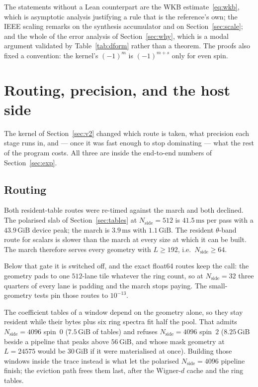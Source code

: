 \documentclass[usenatbib,useAMS]{mnras}
\begin{document}
The statements without a Lean counterpart are the WKB estimate~\eqref{eq:wkb}, which is asymptotic analysis justifying a rule that is the reference's own; the IEEE scaling remarks on the synthesis accumulator and on Section~\ref{sec:scale}; and the whole of the error analysis of Section~\ref{sec:why}, which is a modal argument validated by Table~\ref{tab:dform} rather than a theorem. The proofs also fixed a convention: the kernel's $(-1)^m$ is $(-1)^{m+s}$ only for even spin.

\section{Routing, precision, and the host side}
\label{sec:pipeline}

The kernel of Section~\ref{sec:v2} changed which route is taken, what precision each stage runs in, and --- once it was fast enough to stop dominating --- what the rest of the program costs. All three are inside the end-to-end numbers of Section~\ref{sec:exp}.

\subsection{Routing}
\label{sec:route}

Both resident-table routes were re-timed against the march and both declined. The polarised slab of Section~\ref{sec:tables} at $N_{\mathrm{side}}=512$ is $41.5\,\mathrm{ms}$ per pass with a $43.9\,\mathrm{GiB}$ device peak; the march is $3.9\,\mathrm{ms}$ with $1.1\,\mathrm{GiB}$. The resident $\theta$-band route for scalars is slower than the march at every size at which it can be built. The march therefore serves every geometry with $L\ge192$, i.e.\ $N_{\mathrm{side}}\ge64$.

Below that gate it is switched off, and the exact float64 routes keep the call: the geometry pads to one $512$-lane tile whatever the ring count, so at $N_{\mathrm{side}}=32$ three quarters of every lane is padding and the march stops paying. The small-geometry tests pin those routes to $10^{-13}$.

The coefficient tables of a window depend on the geometry alone, so they stay resident while their bytes plus six ring spectra fit half the pool. That admits $N_{\mathrm{side}}=4096$ spin~$0$ ($7.5\,\mathrm{GiB}$ of tables) and refuses $N_{\mathrm{side}}=4096$ spin~$2$ ($8.25\,\mathrm{GiB}$ beside a pipeline that peaks above $56\,\mathrm{GiB}$, and whose mask geometry at $L=24575$ would be $30\,\mathrm{GiB}$ if it were materialised at once). Building those windows inside the trace instead is what let the polarised $N_{\mathrm{side}}=4096$ pipeline finish; the eviction path frees them last, after the Wigner-$d$ cache and the ring tables.
\end{document}
